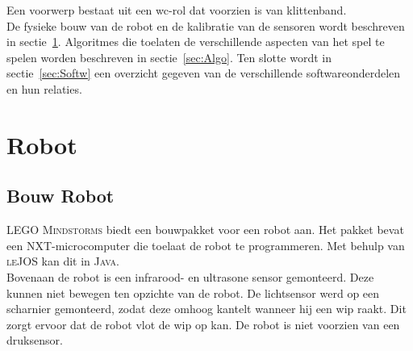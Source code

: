 \documentclass[eind]{penoverslag}
\begin{document}
Een voorwerp bestaat uit een wc-rol dat voorzien is van klittenband.\\

%
%

De fysieke bouw van de robot en de kalibratie van de sensoren wordt beschreven in sectie~\ref{sec:Robot}. Algoritmes die toelaten de verschillende aspecten van het spel te spelen worden beschreven in sectie~\ref{sec:Algo}. Ten slotte wordt in sectie~\ref{sec:Softw} een overzicht gegeven van de verschillende softwareonderdelen en hun relaties.

\section{Robot}
\label{sec:Robot}

\subsection{Bouw Robot}
\label{ssec:Bouw}
\textsc{LEGO Mindstorms} biedt een bouwpakket voor een robot aan. Het pakket bevat een \textsc{NXT}-microcomputer die toelaat de robot te programmeren. Met behulp van \textsc{leJOS} kan dit in \textsc{Java}.\\

Bovenaan de robot is een infrarood- en ultrasone sensor gemonteerd. Deze kunnen niet bewegen ten opzichte van de robot. De lichtsensor werd op een scharnier gemonteerd, zodat deze omhoog kantelt wanneer hij een wip raakt. Dit zorgt ervoor dat de robot vlot de wip op kan. De robot is niet voorzien van een druksensor.\\
\end{document}
